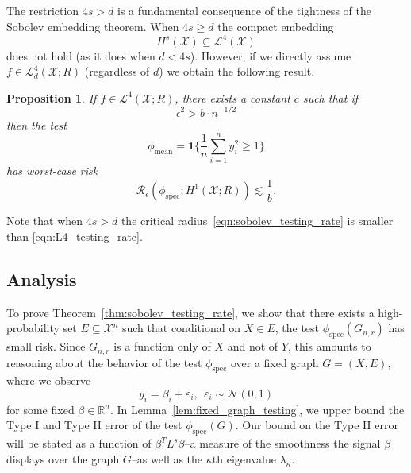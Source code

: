 \documentclass{article}
\newcommand{\Reals}{\mathbb{R}}
\newcommand{\1}{\mathbf{1}}
\newcommand{\Xset}{\mathcal{X}}
\newcommand{\Leb}{\mathcal{L}}
\newcommand{\spec}{\mathrm{spec}}
\theoremstyle{alden}
\theoremstyle{aldenthm}
\newtheorem{proposition}{Proposition}
\theoremstyle{definition}
\theoremstyle{remark}
\begin{document}
The restriction $4s > d$ is a fundamental consequence of the tightness of the Sobolev embedding theorem. When $4s \geq d$ the compact embedding
\begin{equation*}
H^{s}(\mathcal{X}) \subseteq \Leb^4(\mathcal{X}) 
\end{equation*}
does not hold (as it does when $d < 4s$). However, if we directly assume $f \in \mathcal{L}_d^4(\mathcal{X};R)$ (regardless of $d$) we obtain the following result.
\begin{proposition}
	\label{prop:L4_testing_rate}
	If $f \in \Leb^4(\mathcal{X};R)$, there exists a constant $c$ such that if
	\begin{equation}
	\label{eqn:L4_testing_rate}
	\epsilon^2 > b \cdot n^{-1/2}
	\end{equation}
	then the test
	\begin{equation*}
	\phi_{\mathrm{mean}} = \1\{\frac{1}{n}\sum_{i = 1}^{n} y_i^2 \geq 1\}
	\end{equation*}
	has worst-case risk
	\begin{equation*}
	\mathcal{R}_{\epsilon}(\phi_{\mathrm{spec}}; H^1(\mathcal{X};R)) \lesssim \frac{1}{b}. 
	\end{equation*}
\end{proposition}
Note that when $4s > d$ the critical radius~\eqref{eqn:sobolev_testing_rate} is smaller than \eqref{eqn:L4_testing_rate}. 

\subsection{Analysis}

To prove Theorem~\ref{thm:sobolev_testing_rate}, we show that there exists a high-probability set $E \subseteq \Xset^n$ such that conditional on $X \in E$, the test $\phi_{\spec}(G_{n,r})$ has small risk. Since $G_{n,r}$ is a function only of $X$ and not of $Y$, this amounts to reasoning about the behavior of the test $\phi_{\spec}$ over a fixed graph $G = (X,E)$, where we observe
\begin{equation}
y_i = \beta_i + \varepsilon_i,~~\varepsilon_i \sim \mathcal{N}(0,1)
\end{equation}
for some fixed $\beta \in \Reals^n$.  In Lemma~\ref{lem:fixed_graph_testing}, we upper bound the Type I and Type II error of the test $\phi_{\spec}(G)$. Our bound on the Type II error will be stated as a function of $\beta^T L^s \beta$--a measure of the smoothness the signal $\beta$ displays over the graph $G$--as well as the $\kappa$th eigenvalue $\lambda_{\kappa}$.
\end{document}
